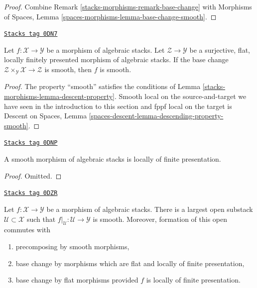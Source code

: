 \begin{proof}
Combine
Remark \ref{stacks-morphisms-remark-base-change}
with
Morphisms of Spaces, Lemma
\ref{spaces-morphisms-lemma-base-change-smooth}.
\end{proof}

\begin{lemma}
\label{stacks-morphisms-lemma-descent-smooth}
\href{https://stacks.math.columbia.edu/tag/0DN7}{\texttt{Stacks tag 0DN7}}

Let $f : \mathcal{X} \to \mathcal{Y}$ be a morphism of algebraic stacks.
Let $\mathcal{Z} \to \mathcal{Y}$ be a surjective, flat, locally finitely
presented morphism of algebraic stacks. If the base change
$\mathcal{Z} \times_\mathcal{Y} \mathcal{X} \to \mathcal{Z}$
is smooth, then $f$ is smooth.
\end{lemma}

\begin{proof}
The property ``smooth''
satisfies the conditions of Lemma \ref{stacks-morphisms-lemma-descent-property}.
Smooth local on the source-and-target we have seen in the
introduction to this section and fppf local on the target is
Descent on Spaces, Lemma
\ref{spaces-descent-lemma-descending-property-smooth}.
\end{proof}

\begin{lemma}
\label{stacks-morphisms-lemma-smooth-locally-finite-presentation}
\href{https://stacks.math.columbia.edu/tag/0DNP}{\texttt{Stacks tag 0DNP}}

A smooth morphism of algebraic stacks is locally of finite presentation.
\end{lemma}

\begin{proof}
Omitted.
\end{proof}

\begin{lemma}
\label{stacks-morphisms-lemma-where-smooth}
\href{https://stacks.math.columbia.edu/tag/0DZR}{\texttt{Stacks tag 0DZR}}

Let $f : \mathcal{X} \to \mathcal{Y}$ be a morphism of algebraic stacks.
There is a largest open substack $\mathcal{U} \subset \mathcal{X}$
such that $f|_\mathcal{U} : \mathcal{U} \to \mathcal{Y}$ is smooth.
Moreover, formation of this open commutes with
\begin{enumerate}
\item precomposing by smooth morphisms,
\item base change by morphisms which are flat and locally of
finite presentation,
\item base change by flat morphisms provided $f$ is locally of
finite presentation.
\end{enumerate}
\end{lemma}

